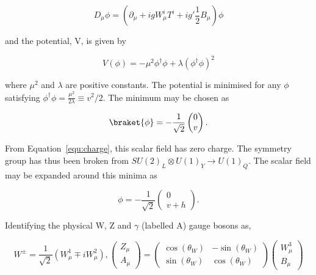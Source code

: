 \begin{equation}
D_{\mu} \phi = (\partial_\mu + igW^i_{\mu}T^i + ig'\frac{1}{2}B_\mu)\phi 
\end{equation}

and the potential, V, is given by

\begin{equation}
V(\phi) =  - \mu^2\phi^{\dagger}\phi + \lambda \left(\phi^{\dagger}\phi\right)^2
\end{equation}

where $\mu^2$ and $\lambda$ are positive constants. The potential is minimised for any $\phi$ satisfying
$\phi^{\dagger}\phi = \frac{\mu^2}{2\lambda} \equiv v^2/2$. The minimum may be chosen as

\begin{equation}
\braket{\phi} =  - \frac{1}{\sqrt{2}}\begin{pmatrix} 0 \\ v\end{pmatrix}.
\end{equation}

From Equation~\ref{equ:charge}, this scalar field has zero charge. The symmetry group has thus been broken from
$SU(2)_L\otimes U(1)_Y \rightarrow U(1)_Q$. The scalar field may be expanded around this minima as

\begin{equation}
\label{equ:phiExp}
\phi =  - \frac{1}{\sqrt{2}}\begin{pmatrix} 0 \\ v + h\end{pmatrix}.
\end{equation}

Identifying the physical W, Z and $\gamma$ (labelled A) gauge bosons as,

\begin{equation}
W^{\pm} = \frac{1}{\sqrt{2}} (W^1_\mu \mp i W^2_\mu), \begin{pmatrix} Z_\mu \\ A_\mu\end{pmatrix} = \begin{pmatrix} \cos(\theta_W) & -\sin(\theta_W) \\ \sin(\theta_W) & \cos(\theta_W)\end{pmatrix} \begin{pmatrix} W^3_\mu \\ B_\mu\end{pmatrix}
\end{equation}

